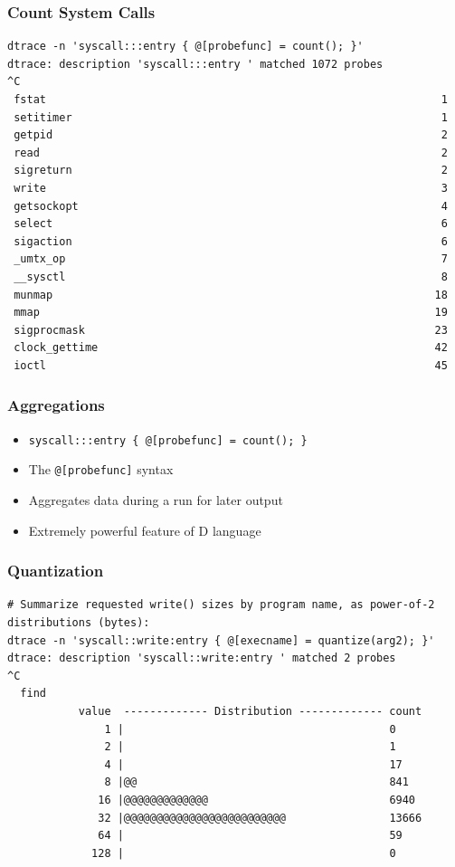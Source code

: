\documentclass[pdftex]{beamer} %
\begin{document}
\begin{frame}[fragile]
  \frametitle{Count System Calls}
\begin{lstlisting}
dtrace -n 'syscall:::entry { @[probefunc] = count(); }'
dtrace: description 'syscall:::entry ' matched 1072 probes
^C
 fstat                                                             1
 setitimer                                                         1
 getpid                                                            2
 read                                                              2
 sigreturn                                                         2
 write                                                             3
 getsockopt                                                        4
 select                                                            6
 sigaction                                                         6
 _umtx_op                                                          7
 __sysctl                                                          8
 munmap                                                           18
 mmap                                                             19
 sigprocmask                                                      23
 clock_gettime                                                    42
 ioctl                                                            45
\end{lstlisting}
\end{frame}

\begin{frame}[fragile]
  \frametitle{Aggregations}
  \begin{itemize}
  \item \verb+syscall:::entry { @[probefunc] = count(); }+
  \item The \verb+@[probefunc]+ syntax
  \item Aggregates data during a run for later output
  \item Extremely powerful feature of D language
  \end{itemize}
\end{frame}

\begin{frame}[fragile]
  \frametitle{Quantization}
\begin{lstlisting}
# Summarize requested write() sizes by program name, as power-of-2 distributions (bytes):
dtrace -n 'syscall::write:entry { @[execname] = quantize(arg2); }'
dtrace: description 'syscall::write:entry ' matched 2 probes
^C
  find                                              
           value  ------------- Distribution ------------- count    
               1 |                                         0        
               2 |                                         1        
               4 |                                         17       
               8 |@@                                       841      
              16 |@@@@@@@@@@@@@                            6940     
              32 |@@@@@@@@@@@@@@@@@@@@@@@@@                13666    
              64 |                                         59       
             128 |                                         0        
\end{lstlisting}
\end{frame}
\end{document}
